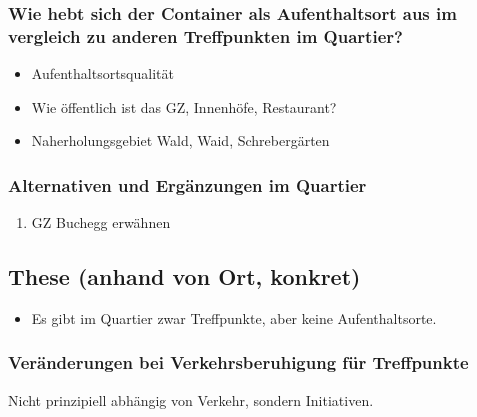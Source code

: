 \documentclass[a4paper,ngerman,11pt]{scrartcl}
\begin{document}
\subsubsection{Wie hebt sich der Container als Aufenthaltsort aus im vergleich zu anderen Treffpunkten im Quartier?}
\label{sec-3-5-4}
\begin{itemize}
\item Aufenthaltsortsqualität
\item Wie öffentlich ist das GZ, Innenhöfe, Restaurant?
\item Naherholungsgebiet Wald, Waid, Schrebergärten
\end{itemize}
\subsubsection{Alternativen und Ergänzungen im Quartier}
\label{sec-3-5-5}
\begin{enumerate}
\item GZ Buchegg erwähnen
\label{sec-3-5-5-1}
\end{enumerate}

\subsection{These (anhand von Ort, konkret)}
\label{sec-3-6}
\begin{itemize}
\item Es gibt im Quartier zwar Treffpunkte, aber keine Aufenthaltsorte.
\end{itemize}
\subsubsection{Veränderungen bei Verkehrsberuhigung für Treffpunkte}
\label{sec-3-6-1}
Nicht prinzipiell abhängig von Verkehr, sondern Initiativen.
\end{document}
